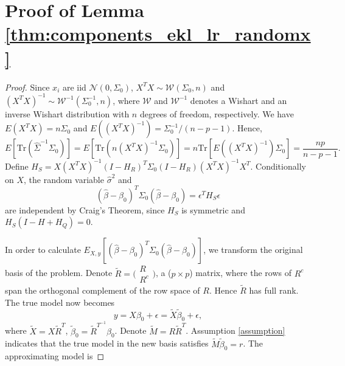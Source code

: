 \section{Proof of Lemma \ref{thm:components_ekl_lr_randomx}}
\begin{proof}
Since $x_i$ are iid $\mathcal{N}(0,\Sigma_0)$, $X^T X \sim \mathcal{W}(\Sigma_0, n)$ and $ (X^T X)^{-1} \sim \mathcal{W}^{-1} (\Sigma_0^{-1}, n)$, where $\mathcal{W}$ and $\mathcal{W}^{-1}$ denotes a Wishart and an inverse Wishart distribution with $n$ degrees of freedom, respectively. We have $E(X^T X) = n\Sigma_0$ and $E((X^T X)^{-1}) = \Sigma_0^{-1} / (n-p-1)$. Hence,
\begin{equation*}
  E \left[ \text{Tr}(\hat \Sigma^{-1}\Sigma_0) \right] = E \left[ \text{Tr} (n (X^T X)^{-1} \Sigma_0) \right] = n \text{Tr}\left[ E\left( (X^T X)^{-1} \right) \Sigma_0\right] = \frac{np}{n-p-1}.
\end{equation*}
Define $H_S = X(X^T X)^{-1}(I-H_R)^T \Sigma_0 (I-H_R) (X^T X)^{-1} X^T$. Conditionally on $X$, the random variable $\hat{\sigma}^2$ and 
\begin{equation*}
(\hat{\beta}-\beta_0)^T \Sigma_0 (\hat{\beta}-\beta_0) = \epsilon^T H_S \epsilon
\end{equation*}
are independent by Craig's Theorem, since $H_S$ is symmetric and $H_S(I-H+H_Q)=0$. 
\iffalse
We also have
\begin{equation*}
n\sigma_0^2 E_{X,y} \left[ \frac{1}{\hat\sigma^2} \right] = n\sigma_0^2 E_X\left[ E_y \left(\frac{1}{\hat\sigma^2}\big| X \right) \right] = n \frac{n}{n-p+m-2},
\end{equation*}
where the last equality we use the result in Lemma \ref{thm:components_ekl_lr_fixedx}. 
\fi
In order to calculate $\displaystyle E_{X,y}  \left [ (\hat \beta-\beta_0)^T \Sigma_0 (\hat \beta-\beta_0) \right ]$, we transform the original basis of the problem. Denote $\tilde{R} = \big(\begin{smallmatrix}
  R\\
  R^c
\end{smallmatrix}\big)$, a ($p \times p$) matrix, where the rows of $R^c$ span the orthogonal complement of the row space of $R$. Hence $\tilde{R}$ has full rank. The true model now becomes
\begin{equation*}
y = X \beta_0 + \epsilon = \tilde{X} \tilde{\beta}_0 + \epsilon,
\end{equation*}
where $\tilde{X} = X \tilde{R}^T$, $\tilde{\beta}_0 = \tilde{R}^{T^{-1}} \beta_0$. Denote $\tilde{M} = R \tilde{R}^T$. Assumption \ref{assumption} indicates that the true model in the new basis satisfies $\tilde{M} \tilde{\beta}_0 = r$. The approximating model is

\end{proof}
